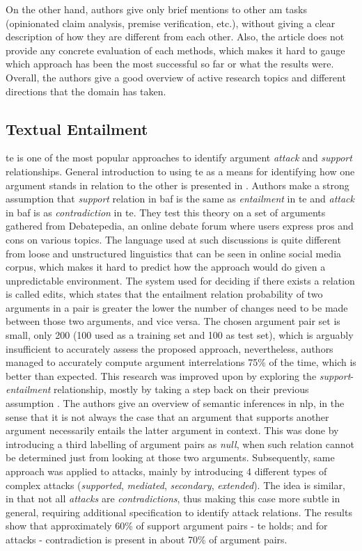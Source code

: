         On the other hand, authors give only brief mentions to other \gls{am} tasks (opinionated claim analysis, premise verification, etc.), without giving a clear description of how they are different from each other. Also, the article does not provide any concrete evaluation of each methods, which makes it hard to gauge which approach has been the most successful so far or what the results were. Overall, the authors give a good overview of active research topics and different directions that the domain has taken.
        
    \subsection{Textual Entailment}
        \gls{te} is one of the most popular approaches to identify argument \textit{attack} and \textit{support} relationships. General introduction to using \gls{te} as a means for identifying how one argument stands in relation to the other is presented in \autocite{Cabrio2012NaturalLA, Cabrio2012CombiningTE}. Authors make a strong assumption that \textit{support} relation in \gls{baf} is the same as \textit{entailment} in \gls{te} and \textit{attack} in \gls{baf} is as \textit{contradiction} in \gls{te}. They test this theory on a set of arguments gathered from Debatepedia, an online debate forum where users express pros and cons on various topics. The language used at such discussions is quite different from loose and unstructured linguistics that can be seen in online social media corpus, which makes it hard to predict how the approach would do given a unpredictable environment. The system used for deciding if there exists a relation is called \gls{edits}, which states that the entailment relation probability of two arguments in a pair is greater the lower the number of changes need to be made between those two arguments, and vice versa. The chosen argument pair set is small, only 200 (100 used as a training set and 100 as test set), which is arguably insufficient to accurately assess the proposed approach, nevertheless, authors managed to accurately compute argument interrelations 75\% of the time, which is better than expected. This research was improved upon by exploring the \textit{support}-\textit{entailment} relationship, mostly by taking a step back on their previous assumption \autocite{Cabrio2013ANL, Cabrio2013DetectingBS}. The authors give an overview of semantic inferences in \gls{nlp}, in the sense that it is not always the case that an argument that supports another argument necessarily entails the latter argument in context. This was done by introducing a third labelling of argument pairs as \textit{null}, when such relation cannot be determined just from looking at those two arguments. Subsequently, same approach was applied to attacks, mainly by introducing 4 different types of complex attacks (\textit{supported}, \textit{mediated}, \textit{secondary}, \textit{extended}). The idea is similar, in that not all \textit{attacks} are \textit{contradictions}, thus making this case more subtle in general, requiring additional specification to identify attack relations. The results show that approximately 60\% of support argument pairs - \gls{te} holds; and for attacks - contradiction is present in about 70\% of argument pairs.
